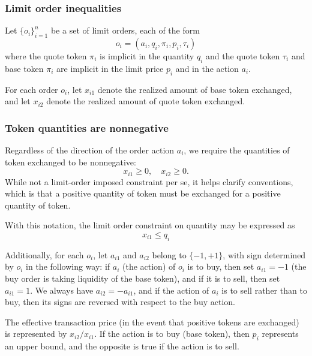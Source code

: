 \documentclass[11pt, reqno]{amsart}
\theoremstyle{definition}
\theoremstyle{remark}
\begin{document}
\subsubsection{Limit order inequalities}
Let $\{o_i\}_{i = 1}^n$ be a set of limit orders, each of the form
\[
	o_i = (a_i, q_i, \pi_i, p_i, \tau_i)
\]
where the quote token $\pi_i$ is implicit in the quantity $q_i$ and
the quote token $\tau_i$ and base token $\pi_i$ are implicit in the limit price
$p_i$ and in the action $a_i$.

For each order $o_i$, let $x_{i1}$ denote the realized amount of base token
exchanged, and let $x_{i2}$ denote the realized amount of quote token
exchanged.

\subsubsection{Token quantities are nonnegative}
Regardless of the direction of the order action $a_i$, we require the quantities
of token exchanged to be nonnegative:
\[
    x_{i1} \geq 0, \quad x_{i2} \geq 0.
\]
While not a limit-order imposed constraint per se, it helps clarify
conventions, which is that a positive quantity of token must be exchanged
for a positive quantity of token.
%

With this notation, the limit order constraint on quantity may be expressed as
\[
    x_{i1} \leq q_i
\]

Additionally, for each $o_i$, let $a_{i1}$ and $a_{i2}$ belong to
$\{-1, +1\}$, with sign determined by $o_i$ in the following way: if
$a_i$ (the action) of $o_i$ is to buy, then set $a_{i1} = -1$ (the buy
order is taking liquidity of the base token), and if it is to sell, then
set $a_{i1} = 1$. We always have $a_{i2} = -a_{i1}$, and if the action
of $a_i$ is to sell rather than to buy, then its signs are reversed with
respect to the buy action.

The effective transaction price (in the event that positive tokens are
exchanged) is represented by $x_{i2} / x_{i1}$. If the action is to buy (base
token), then $p_i$ represents an upper bound, and the opposite is true if the
action is to sell.
\end{document}
